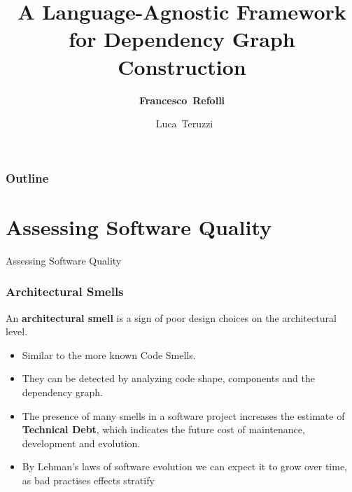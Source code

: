 \documentclass[dvipsnames, 10pt, table]{beamer}
\date[6 November 2025]{}
\title[TSD Seminary]{A Language-Agnostic Framework for Dependency Graph Construction}
\subtitle{}
\author[Francesco~Refolli]{\textbf{Francesco~Refolli} \and ~Luca~Teruzzi}
\begin{document}
\frame{\titlepage}

\begin{frame}
\frametitle{Outline}
\tableofcontents
\end{frame}


\section{Assessing Software Quality}
\begin{frame}
  \centering
  \Huge
  Assessing Software Quality
\end{frame}

\begin{frame}
  \frametitle{Architectural Smells}
  \begin{definition}
    An \textbf{architectural smell} is a sign of poor design choices on the architectural level.
  \end{definition}

  \begin{itemize}
    \item Similar to the more known Code Smells.
    \item They can be detected by analyzing code shape, components and the dependency graph.
    \item The presence of many smells in a software project increases the estimate of \textbf{Technical Debt}, which indicates the future cost of maintenance, development and evolution.
    \item By Lehman's laws of software evolution we can expect it to grow over time, as bad practises effects stratify
  \end{itemize}
\end{frame}
\end{document}
